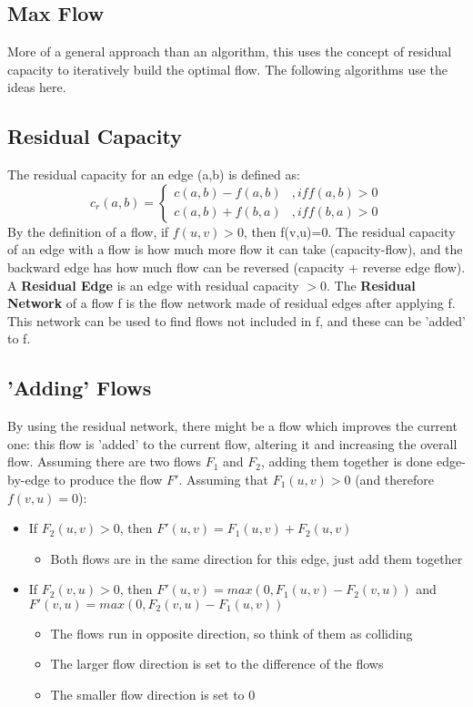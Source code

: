 \subsection{Max Flow}
More of a general approach than an algorithm, this uses the concept of residual capacity to iteratively build the optimal flow. The following algorithms use the ideas here. 

\subsection{Residual Capacity}
The residual capacity for an edge (a,b) is defined as:
\begin{equation}
    c_r(a,b) = 
    \begin{cases}
        c(a,b) - f(a,b) &, if f(a,b) > 0 \\
        c(a,b) + f(b,a) &, if f(b,a) > 0
    \end{cases}
\end{equation}
By the definition of a flow, if $f(u,v)>0$, then f(v,u)=0. The residual capacity of an edge with a flow is how much more flow it can take (capacity-flow), and the backward edge has how much flow can be reversed (capacity + reverse edge flow). \\
A \textbf{Residual Edge} is an edge with residual capacity $>0$. The \textbf{Residual Network} of a flow f is the flow network made of residual edges after applying f. This network can be used to find flows not included in f, and these can be 'added' to f.

\subsection{'Adding' Flows}
By using the residual network, there might be a flow which improves the current one: this flow is 'added' to the current flow, altering it and increasing the overall flow. Assuming there are two flows $F_1$ and $F_2$, adding them together is done edge-by-edge to produce the flow $F'$. Assuming that $F_1(u,v) > 0$ (and therefore $f(v,u)=0$):
\begin{itemize}
    \item If $F_2(u,v) > 0$, then $F'(u,v) = F_1(u,v) + F_2(u,v)$
        \begin{itemize}
            \item Both flows are in the same direction for this edge, just add them together
        \end{itemize}
    \item If $F_2(v,u) > 0$, then $F'(u,v) = max(0, F_1(u,v) - F_2(v,u))$ and $F'(v,u) = max(0, F_2(v,u) - F_1(u,v))$
        \begin{itemize}
            \item The flows run in opposite direction, so think of them as colliding
            \item The larger flow direction is set to the difference of the flows
            \item The smaller flow direction is set to 0
        \end{itemize}    
\end{itemize}

